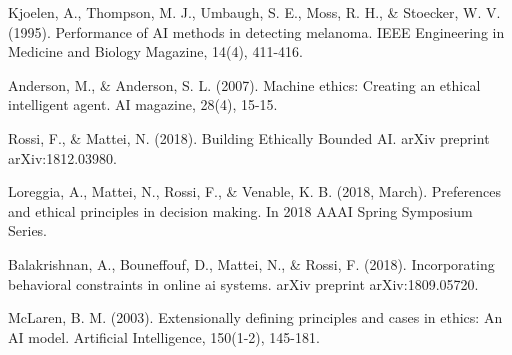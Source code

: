 \documentclass{svproc}
\begin{document}
\begin{thebibliography}{5}
%
Kjoelen, A., Thompson, M. J., Umbaugh, S. E., Moss, R. H., \& Stoecker, W. V. (1995). Performance of AI methods in detecting melanoma. IEEE Engineering in Medicine and Biology Magazine, 14(4), 411-416.

Anderson, M., \& Anderson, S. L. (2007). Machine ethics: Creating an ethical intelligent agent. AI magazine, 28(4), 15-15.

Rossi, F., \& Mattei, N. (2018). Building Ethically Bounded AI. arXiv preprint arXiv:1812.03980.


Loreggia, A., Mattei, N., Rossi, F., \& Venable, K. B. (2018, March). Preferences and ethical principles in decision making. In 2018 AAAI Spring Symposium Series.

Balakrishnan, A., Bouneffouf, D., Mattei, N., \& Rossi, F. (2018). Incorporating behavioral constraints in online ai systems. arXiv preprint arXiv:1809.05720.

McLaren, B. M. (2003). Extensionally defining principles and cases in ethics: An AI model. Artificial Intelligence, 150(1-2), 145-181.

\end{thebibliography}
\end{document}
